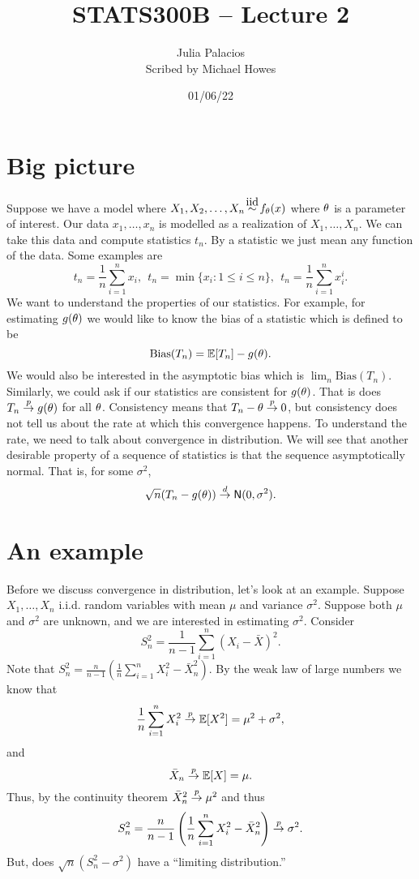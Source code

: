 




\title{STATS300B -- Lecture 2}
\author{Julia Palacios\\ Scribed by Michael Howes}
\date{01/06/22}

\pagestyle{fancy}
\fancyhf{}


\maketitle
\tableofcontents
\section{Big picture}
Suppose we have a model where $X_1,X_2,\ldots, X_n \iid f_\ta(x)$ where ${\theta}$ is a parameter of interest. Our data $x_1,\ldots,x_n$ is modelled as a realization of $X_1,\ldots,X_n$. We can take this data and compute statistics $t_n$. By a statistic we just mean any function of the data. Some examples are 
\[t_n = \frac{1}{n}\sum_{i=1}^n x_i, ~~ t_n = \min\{x_i:1\le i \le n\}, ~~ t_n = \frac{1}{n}\sum_{i=1}^nx_i^i.  \]
We want to understand the properties of our statistics. For example, for estimating $g({\theta})$ we would like to know the bias of a statistic which is defined to be 
\[\text{Bias}(T_n) = {\mathbb{E}}[T_n]-g({\theta}). \]
We would also be interested in the asymptotic bias which is $\lim_n \text{Bias}(T_n)$. Similarly, we could ask if our statistics are consistent for $g({\theta})$. That is does $T_n \stackrel{p}{\to} g({\theta})$ for all ${\theta}$. Consistency means that $T_n - {\theta} \stackrel{p}{\to} 0$, but consistency does not tell us about the rate at which this convergence happens. To understand the rate, we need to talk about convergence in distribution. We will see that another desirable property of a sequence of statistics is that the sequence asymptotically normal. That is, for some $\sigma^2$,
\[\sqrt{n}(T_n-g({\theta})) \stackrel{d}{\to} \mathsf{N}(0,\sigma^2). \]
\section{An example}
Before we discuss convergence in distribution, let's look at an example. Suppose $X_1,\ldots, X_n$ i.i.d. random variables with mean $\mu$ and variance $\sigma^2$. Suppose both $\mu$ and $\sigma^2$ are unknown, and we are interested in estimating $\sigma^2$. Consider
\[S_n^2 = \frac{1}{n-1}\sum_{i=1}^n (X_i-\bar{X})^2. \]
Note that $S_n^2 = \frac{n}{n-1}\left(\frac{1}{n}\sum_{i=1}^n X_i^2 -\bar{X}_n^2\right)$. By the weak law of large numbers we know that 
\[\frac{1}{n}\sum_{i=1}^n X_i^2 \stackrel{p}{\to} {\mathbb{E}}[X^2] = \mu^2+\sigma^2, \]
and 
\[\bar{X}_n \stackrel{p}{\to} {\mathbb{E}}[X] =\mu. \]
Thus, by the continuity theorem $\bar{X}_n^2 \stackrel{p}{\to} \mu^2$ and thus
\[S_n^2 = \frac{n}{n-1}\left(\frac{1}{n}\sum_{i=1}^n X_i^2 -\bar{X}_n^2\right)\stackrel{p}{\to}\sigma^2.\]
But, does $\sqrt{n}(S_n^2-\sigma^2)$ have a ``limiting distribution.''
